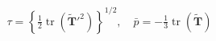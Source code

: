 \documentclass[preview]{standalone}
\begin{document}
\begin{align*}
\tau = \left\{\tfrac{1}{2}\operatorname{tr}(\tilde{\mathbf{T}}'^2)\right\}^{1/2},\quad \bar{p} = -\tfrac{1}{3}\operatorname{tr}(\tilde{\mathbf{T}})
\end{align*}
\end{document}
